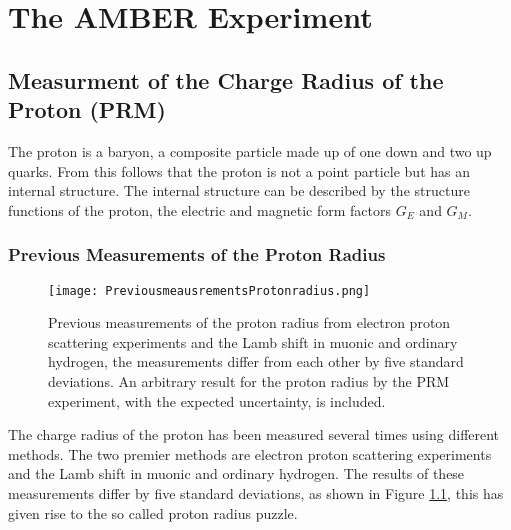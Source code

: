 \chapter{The AMBER Experiment}\label{cha:theory}

\noindent
\section{Measurment of the Charge Radius of the Proton (PRM)}\label{sec:proton_radius}
The proton is a baryon, a composite particle made up of one down and two up quarks.
From this follows that the proton is not a point particle but has an internal structure.\autocite{Workman:2836514}
\newline
The internal structure can be described by the structure functions of the proton, 
the electric and magnetic form factors $G_E$ and $G_M$.\autocite{ProposalAmber}	
\subsection{Previous Measurements of the Proton Radius}
\begin{figure}[h]
	\centering
	\texttt{[image: PreviousmeausrementsProtonradius.png]}
	\caption{Previous measurements of the proton radius from electron proton scattering experiments and the Lamb shift in muonic and ordinary hydrogen,
	 the measurements differ from each other by five standard deviations. An arbitrary result for the proton radius by the PRM experiment, with the expected uncertainty, is included.\autocite{ProposalAmber} }
	\label{fig:previous_proton_radius}
\end{figure}

The charge radius of the proton has been measured several times using different methods.
The two premier methods are electron proton scattering experiments and the Lamb shift in muonic and ordinary hydrogen.
The results of these measurements differ by five standard deviations, as shown in Figure \ref{fig:previous_proton_radius},
this has given rise to the so called proton radius puzzle.\autocite{ProposalAmber}

